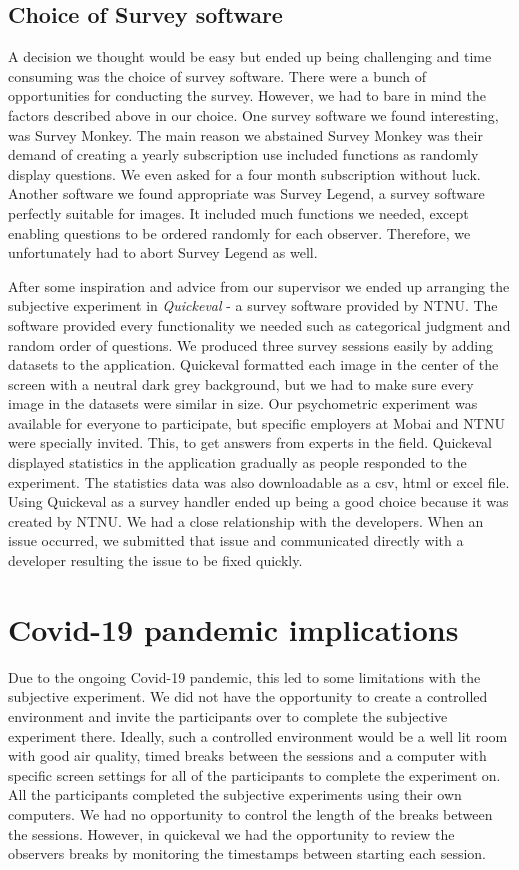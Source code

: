 \subsection*{Choice of Survey software}
\label{subsection:choicesoftware}
A decision we thought would be easy but ended up being challenging and time consuming was the choice of survey software. There were a bunch of opportunities for conducting the survey. However, we had to bare in mind the factors described above in our choice. One survey software we found interesting, was Survey Monkey. The main reason we abstained Survey Monkey was their demand of creating a yearly subscription use included functions as randomly display questions. We even asked for a four month subscription without luck. Another software we found appropriate was Survey Legend, a survey software perfectly suitable for images. It included much functions we needed, except enabling questions to be ordered randomly for each observer. Therefore, we unfortunately had to abort Survey Legend as well. 

After some inspiration and advice from our supervisor we ended up arranging the subjective experiment in \textit{Quickeval} - a survey software provided by NTNU. The software provided every functionality we needed such as categorical judgment and random order of questions. We produced three survey sessions easily by adding datasets to the application. Quickeval formatted each image in the center of the screen with a neutral dark grey background, but we had to make sure every image in the datasets were similar in size. Our psychometric experiment was available for everyone to participate, but specific employers at Mobai and NTNU were specially invited. This, to get answers from experts in the field. Quickeval displayed statistics in the application gradually as people responded to the experiment. The statistics data was also downloadable as a csv, html or excel file. 
Using Quickeval as a survey handler ended up being a good choice because it was created by NTNU. We had a close relationship with the developers. When an issue occurred, we submitted that issue and communicated directly with a developer resulting the issue to be fixed quickly. 

\section{Covid-19 pandemic implications}
Due to the ongoing Covid-19 pandemic, this led to some limitations with the subjective experiment. We did not have the opportunity to create a controlled environment and invite the participants over to complete the subjective experiment there. Ideally, such a controlled environment would be a well lit room with good air quality, timed breaks between the sessions and a computer with specific screen settings for all of the participants to complete the experiment on. All the participants completed the subjective experiments using their own computers. We had no opportunity to control the length of the breaks between the sessions. However, in quickeval we had the opportunity to review the observers breaks by monitoring the timestamps between starting each session. 

